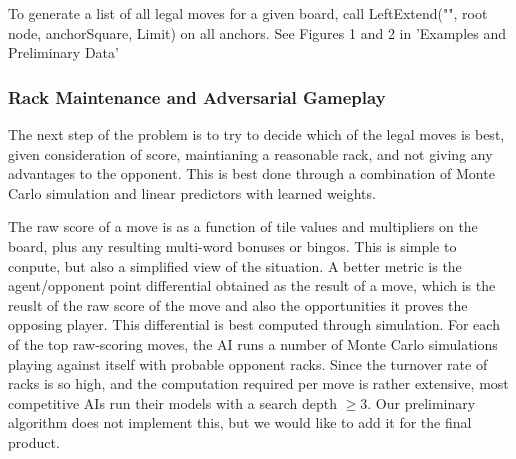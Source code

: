 \documentclass[12pt]{article}
\begin{document}
To generate a list of all legal moves for a given board, call
LeftExtend("", root node, anchorSquare, Limit) on all anchors. See Figures 1 and 2 in 'Examples and Preliminary Data' 




\subsubsection*{Rack Maintenance and Adversarial Gameplay}
The next step of the problem is to try to decide which of the legal
moves is best, given consideration of score, maintianing a reasonable
rack, and not giving any advantages to the opponent. This is best done
through a combination of Monte Carlo simulation and linear predictors
with learned weights. 

The raw score of a move is as a function of tile
values and multipliers on the board, plus any resulting multi-word
bonuses or bingos. This is simple to conpute, but also a simplified view of the situation. A better metric is the agent/opponent point differential obtained as the result of a move, which is the reuslt of the raw score of the move and also the opportunities it proves the opposing player. This differential is best computed
through simulation. For each of the top raw-scoring moves, the AI runs
a number of Monte Carlo simulations playing against itself with
probable opponent racks. Since the turnover rate of racks is so high,
and the computation required per move is rather extensive, most
competitive AIs run their models with a search depth $\geq 3$. Our
preliminary algorithm does not implement this, but we would like to
add it for the final product.
\end{document}
